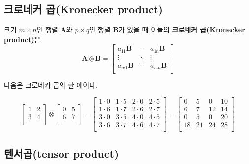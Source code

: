 \documentclass[b5paper,]{scrbook}
\theoremstyle{plain}
\theoremstyle{definition}
\numberwithin{equation}{section}
\let\BeginKnitrBlock\begin \let\EndKnitrBlock\end
\begin{document}
\subsection{크로네커 곱(Kronecker product)}\label{-kronecker-product}

\BeginKnitrBlock{definition}[크로네커 곱]
\protect\hypertarget{def:unnamed-chunk-4}{}{\label{def:unnamed-chunk-4}
{} }크기 \(m \times n\)인 행렬
\(\mathbf{A}\)와 \(p\times q\)인 행렬 \(\mathbf{B}\)가 있을 때 이들의
\textbf{크로네커 곱(Kronecker product)}은 \[\mathbf{A}\otimes\mathbf{B}
=
\begin{bmatrix}
a_{11}\mathbf{B} & \cdots & a_{1n}\mathbf{B} \\
\vdots & \ddots & \vdots \\
a_{m1}\mathbf{B} & \cdots & a_{mn}\mathbf{B} \\
\end{bmatrix}
\]
\EndKnitrBlock{definition}

\BeginKnitrBlock{example}[크로네커 곱의 예]
\protect\hypertarget{exm:unnamed-chunk-5}{}{\label{exm:unnamed-chunk-5}
{} }다음은 크로네커 곱의 한 예이다.

\[
\begin{bmatrix}
1 & 2\\
3 & 4\\
\end{bmatrix}
\otimes
\begin{bmatrix}
0 & 5\\
6 & 7\\
\end{bmatrix}
=
\begin{bmatrix}
1\cdot 0 & 1\cdot 5 & 2\cdot 0 & 2\cdot 5\\
1\cdot 6 & 1\cdot 7 & 2\cdot 6 & 2\cdot 7\\
3\cdot 0 & 3\cdot 5 & 4\cdot 0 & 4\cdot 5\\
3\cdot 6 & 3\cdot 7 & 4\cdot 6 & 4\cdot 7\\
\end{bmatrix}
=
\begin{bmatrix}
0 & 5 & 0 & 10\\
6 & 7 & 12 & 14\\
0 & 5 & 0 & 20\\
18 & 21 & 24 & 28\\
\end{bmatrix}
\]
\EndKnitrBlock{example}

\subsection{텐서곱(tensor product)}\label{tensor-product}
\end{document}
